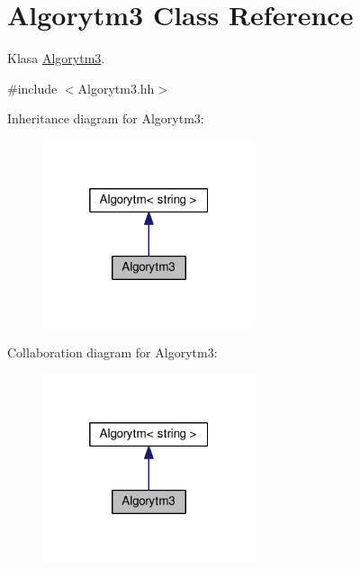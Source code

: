 \hypertarget{a00004}{}\section{Algorytm3 Class Reference}
\label{a00004}


Klasa \hyperlink{a00004}{Algorytm3}.  




{\ttfamily \#include $<$Algorytm3.\+hh$>$}



Inheritance diagram for Algorytm3\+:
\nopagebreak
\begin{figure}[H]
\begin{center}
\leavevmode
\includegraphics[width=176pt]{a00110}
\end{center}
\end{figure}


Collaboration diagram for Algorytm3\+:
\nopagebreak
\begin{figure}[H]
\begin{center}
\leavevmode
\includegraphics[width=176pt]{a00111}
\end{center}
\end{figure}
